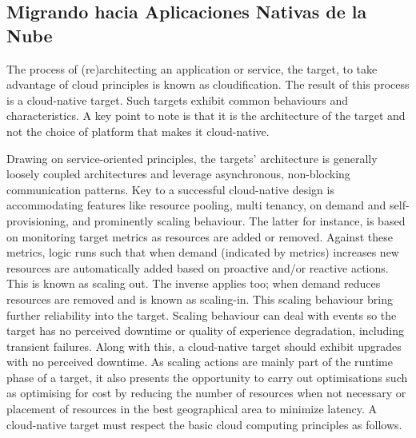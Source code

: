 	\subsection{Migrando hacia Aplicaciones Nativas de la Nube}
	
    The process of (re)architecting an application or service, the target, to take advantage of cloud principles is known as cloudification. The result of this process is a cloud-native target. Such targets exhibit common behaviours and characteristics. A key point to note is that it is the architecture of the target and not the choice of platform that makes it cloud-native. 

    Drawing on service-oriented principles, the targets’ architecture is generally loosely coupled architectures and leverage asynchronous, non-blocking communication patterns. Key to a successful cloud-native design is accommodating features like resource pooling, multi tenancy, on demand and self-provisioning, and prominently scaling behaviour. The latter for instance, is based on monitoring target metrics as resources are added or removed. Against these metrics, logic runs such that when demand (indicated by metrics) increases new resources are automatically added based on proactive and/or reactive actions. This is known as scaling out. The inverse applies too; when demand reduces resources are removed and is known as scaling-in. This scaling behaviour bring further reliability into the target. Scaling behaviour can deal with events so the target has no perceived downtime or quality of experience degradation, including transient failures. Along with this, a cloud-native target should exhibit upgrades with no perceived downtime. As scaling actions are mainly part of the runtime phase of a target, it also presents the opportunity to carry out optimisations such as optimising for cost by reducing the number of resources when not necessary or placement of resources in the best geographical area to minimize latency. A cloud-native target must respect the basic cloud computing principles as follows.

